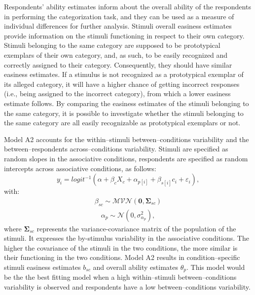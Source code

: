 \documentclass[12pt]{book}
\begin{document}
Respondents' ability estimates inform about the overall ability of the respondents in performing the categorization task, and they can be used as a measure of individual differences for further analysis. 
Stimuli overall easiness estimates provide information on the stimuli functioning in respect to their own category. Stimuli belonging to the same category are supposed to be prototypical exemplars of their own category, and, as such, to be easily recognized and correctly assigned to their category. Consequently, they should have similar easiness estimates.
If a stimulus is not recognized as a prototypical exemplar of its alleged category, it will have a higher chance of getting incorrect responses (i.e., being assigned to the incorrect category), from which a lower easiness estimate follows. By comparing the easiness estimates of the stimuli belonging to the same category, it is possible to investigate whether the stimuli belonging to the same category are all easily recognizable as prototypical exemplars or not.


Model A2 accounts for the within--stimuli between--conditions variability and the between--respondents across--conditions variability. Stimuli are specified as random slopes in the associative conditions, respondents are specified as random intercepts across associative conditions, as follows: 
\begin{equation}\label{Accuracy2}
	y_{i} = logit^{-1}(\alpha + \beta_cX_c + \alpha_{p[i]} +  \beta_{s[i]}c_{i} + \varepsilon_{i}),
\end{equation}
with:
\begin{align}
	\beta_{sc} \sim \mathcal{MVN}(\bm{0}, \bm{\Sigma}_{sc})
\end{align}
\begin{align}
	\alpha_{p} \sim  \mathcal{N} (0, \sigma_{\alpha_p}^2), 
\end{align}
where $\bm{\Sigma}_{sc}$ represents the variance-covariance matrix of the population of the stimuli. It expresses the by-stimulus variability in the associative conditions. The higher the covariance of the stimuli in the two conditions, the more similar is their functioning in the two conditions.
Model A2 results in condition--specific stimuli easiness estimates $b_{sc}$ and overall ability estimates $\theta_{p}$.
This model would be the the best fitting model when a high within--stimuli between--conditions variability is observed and respondents have a low between--conditions variability. 
\end{document}
